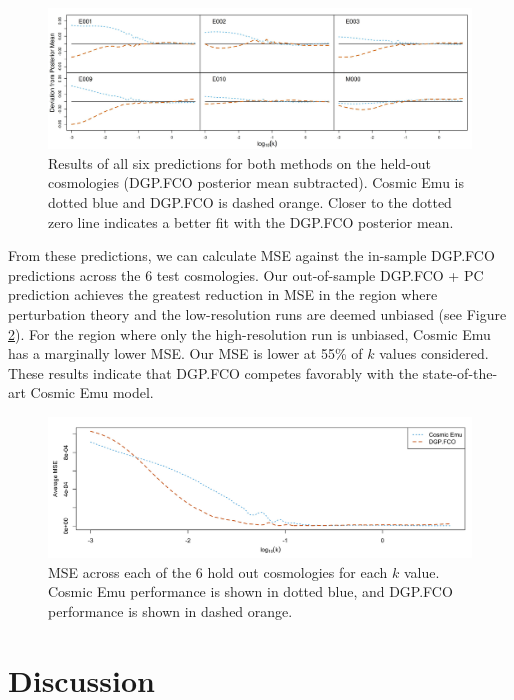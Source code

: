 \documentclass[11pt]{article}
\begin{document}
\begin{figure}[!b]
    \centering
    \includegraphics[width=\textwidth]{pred_1to6.jpeg}
    \caption{Results of all six predictions for both methods on the held-out 
    cosmologies (DGP.FCO posterior mean subtracted). Cosmic Emu is dotted blue and DGP.FCO is dashed orange.
    Closer to the dotted zero line indicates a better fit with the DGP.FCO posterior mean.}
    \label{fig:plot_pred_1to6}
\end{figure}

From these predictions, we can calculate MSE against the in-sample DGP.FCO predictions across the 6
test cosmologies. 
Our out-of-sample DGP.FCO + PC prediction achieves the greatest reduction in MSE in the region 
where perturbation theory and the low-resolution runs are deemed unbiased (see Figure \ref{fig:mse_by_k}). 
For the region where only the high-resolution run is unbiased, Cosmic Emu has a marginally lower
MSE. Our MSE is lower at 55\% of $k$ values considered. These results indicate that DGP.FCO 
competes favorably with the state-of-the-art Cosmic Emu model.

\begin{figure}
    \centering
    \includegraphics[width=\textwidth]{mse_by_k.jpeg}
    \caption{MSE across each of the 6 hold out cosmologies for each $k$ value. Cosmic Emu 
    performance is shown in dotted blue, and DGP.FCO performance is shown in dashed orange.}
    \label{fig:mse_by_k}
\end{figure}

\section{Discussion}
\label{sec:disc}
\end{document}
